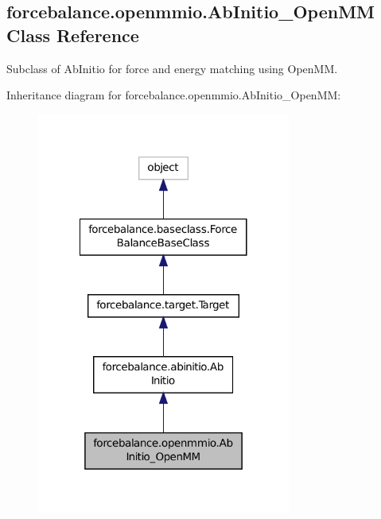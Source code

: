 \hypertarget{classforcebalance_1_1openmmio_1_1AbInitio__OpenMM}{\subsection{forcebalance.\-openmmio.\-Ab\-Initio\-\_\-\-Open\-M\-M Class Reference}
\label{classforcebalance_1_1openmmio_1_1AbInitio__OpenMM}
}


Subclass of Ab\-Initio for force and energy matching using Open\-M\-M.  




Inheritance diagram for forcebalance.\-openmmio.\-Ab\-Initio\-\_\-\-Open\-M\-M\-:\nopagebreak
\begin{figure}[H]
\begin{center}
\leavevmode
\includegraphics[width=236pt]{classforcebalance_1_1openmmio_1_1AbInitio__OpenMM__inherit__graph}
\end{center}
\end{figure}


